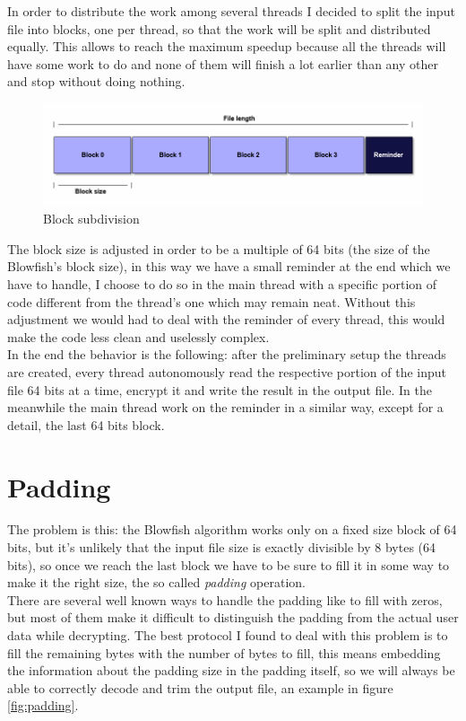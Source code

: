 In order to distribute the work among several threads I decided to split the input file into blocks, one per thread, so that the work will be split and distributed equally. This allows to reach the maximum speedup because all the threads will have some work to do and none of them will finish a lot earlier than any other and stop without doing nothing.

\begin{figure}[H]
\centering
\includegraphics[scale = 0.4]{./Pictures/multithreading} %
\caption{Block subdivision}
\label{fig:multithreading}
\end{figure}

The block size is adjusted in order to be a multiple of 64 bits (the size of the Blowfish's block size), in this way we have a small reminder at the end which we have to handle, I choose to do so in the main thread with a specific portion of code different from the thread's one which may remain neat. Without this adjustment we would had to deal with the reminder of every thread, this would make the code less clean and uselessly complex.\\
In the end the behavior is the following: after the preliminary setup the threads are created, every thread autonomously read the respective portion of the input file 64 bits at a time, encrypt it and write the result in the output file. In the meanwhile the main thread work on the reminder in a similar way, except for a detail, the last 64 bits block.

\section{Padding}
The problem is this: the Blowfish algorithm works only on a fixed size block of 64 bits, but it's unlikely that the input file size is exactly divisible by 8 bytes (64 bits), so once we reach the last block we have to be sure to fill it in some way to make it the right size, the so called \emph{padding} operation.\\
There are several well known ways to handle the padding like to fill with zeros, but most of them make it difficult to distinguish the padding from the actual user data while decrypting. The best protocol I found to deal with this problem is to fill the remaining bytes with the number of bytes to fill, this means embedding the information about the padding size in the padding itself, so we will always be able to correctly decode and trim the output file, an example in figure \ref{fig:padding}.

